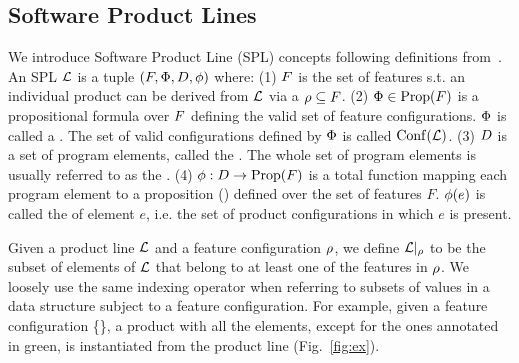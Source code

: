 \vspace{-0.15in}
\subsection{Software Product Lines}
\vspace{-0.1in}
We introduce Software Product Line (SPL) concepts following definitions from~\cite{Salay:2014}.
An SPL $\mathcal{L}$ is a tuple $(F, \Phi, D, \phi)$ where:
(1) $F$ is the set of features s.t.  an individual product can be derived from $\mathcal{L}$ via a  $\rho \subseteq F$.
(2) $\Phi \in \operatorname{Prop}(F)$ is a propositional formula over $F$ defining the valid set of feature configurations. $\Phi$ is called a . The set of valid configurations defined by $\Phi$ is called $\operatorname{Conf}(\mathcal{L})$.
(3) $D$ is a set of program elements, called the . The whole set of program elements is usually referred to as the . 
(4) $\phi:D \to \operatorname{Prop}(F)$ is a total function mapping each program element to a proposition () defined over the set of features $F$. $\phi(e)$ is called the  of element $e$, i.e. the set of product configurations in which $e$ is present.

Given a product line $\mathcal{L}$ and a feature configuration $\rho$, we define $\mathcal{L}|_\rho$ to be the subset of elements of $\mathcal{L}$ that belong to at least one of the features in $\rho$. We loosely use the same indexing operator when referring to subsets of values in a data structure subject to a feature configuration. For example, given a feature configuration \{\}, a product with all the elements, except for the ones annotated in green, is instantiated from the product line (Fig.~\ref{fig:ex}).
